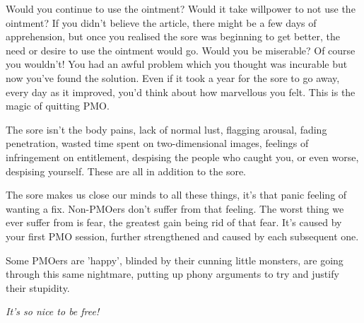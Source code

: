 \documentclass[easypeasy.tex]{subfiles}
\begin{document}
Would you continue to use the ointment? Would it take willpower to not use the ointment? If you didn't believe the article, there might be a few days of apprehension, but once you realised the sore was beginning to get better, the need or desire to use the ointment would go. Would you be miserable? Of course you wouldn't! You had an awful problem which you thought was incurable but now you've found the solution. Even if it took a year for the sore to go away, every day as it improved, you'd think about how marvellous you felt. This is the magic of quitting PMO.

The sore isn't the body pains, lack of normal lust, flagging arousal, fading penetration, wasted time spent on two-dimensional images, feelings of infringement on entitlement, despising the people who caught you, or even worse, despising yourself. These are all in addition to the sore.

The sore makes us close our minds to all these things, it's that panic feeling of wanting a fix. Non-PMOers don't suffer from that feeling. The worst thing we ever suffer from is fear, the greatest gain being rid of that fear. It's caused by your first PMO session, further strengthened and caused by each subsequent one.

Some PMOers are 'happy', blinded by their cunning little monsters, are going through this same nightmare, putting up phony arguments to try and justify their stupidity.

\textit{\Large It's so nice to be free!}
\end{document}
